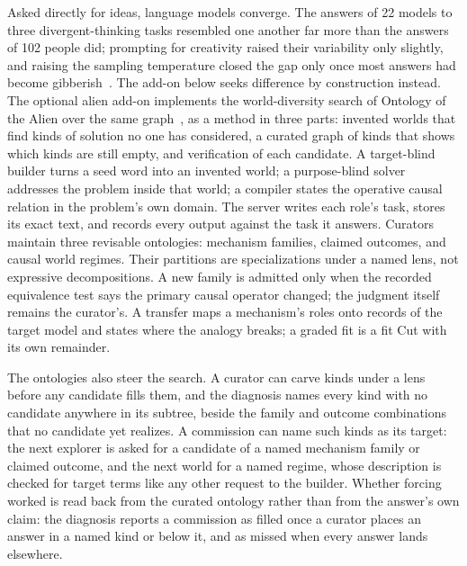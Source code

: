 \documentclass[11pt,a4paper]{article}
\begin{document}
Asked directly for ideas, language models converge. The answers of 22 models to
three divergent-thinking tasks resembled one another far more than the answers
of 102 people did; prompting for creativity raised their variability only
slightly, and raising the sampling temperature closed the gap only once most
answers had become gibberish~\cite{wengerKenett2026homogeneous}. The add-on
below seeks difference by construction instead. The optional alien add-on
implements the world-diversity search of Ontology of
the Alien over the same graph~\cite{westerbergOntology2026}, as a method in three
parts: invented worlds that find kinds of solution no one has considered, a
curated graph of kinds that shows which kinds are still empty, and verification of
each candidate. A target-blind builder turns a seed word into an invented world; a
purpose-blind solver addresses the problem inside that world; a compiler states the
operative causal relation in the problem's own domain. The server writes each
role's task, stores its exact text, and records every output against the task it
answers. Curators maintain three revisable ontologies: mechanism families, claimed
outcomes, and causal world regimes. Their partitions are specializations under a
named lens, not expressive decompositions. A new family is admitted only when the
recorded equivalence test says the primary causal operator changed; the judgment
itself remains the curator's. A transfer maps a mechanism's roles onto records of
the target model and states where the analogy breaks; a graded fit is a fit Cut
with its own remainder.

The ontologies also steer the search. A curator can carve kinds under a lens
before any candidate fills them, and the diagnosis names every kind with no
candidate anywhere in its subtree, beside the family and outcome combinations that
no candidate yet realizes. A commission can name such kinds as its target: the next
explorer is asked for a candidate of a named mechanism family or claimed outcome,
and the next world for a named regime, whose description is checked for target
terms like any other request to the builder. Whether forcing worked is read back
from the curated ontology rather than from the answer's own claim: the diagnosis
reports a commission as filled once a curator places an answer in a named kind or
below it, and as missed when every answer lands elsewhere.
\end{document}
